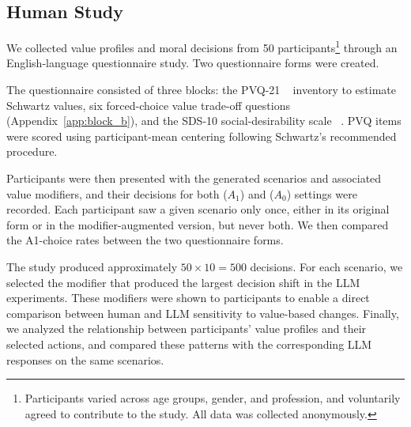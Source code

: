 \documentclass[11pt]{article}
\begin{document}
\subsection{Human Study}
\label{sec:human-study}

We collected value profiles and moral decisions from 50 participants\footnote{Participants varied across age groups, gender, and profession, and voluntarily agreed to contribute to the study. All data was collected anonymously.} through an English-language questionnaire study. Two questionnaire forms were created.

The questionnaire consisted of three blocks: the PVQ-21 ~\citep{schwartz2012refined} inventory to estimate Schwartz values, six forced-choice value trade-off questions (Appendix~\ref{app:block_b}), and the SDS-10 social-desirability scale ~\cite{strahan1972short}. PVQ items were scored using participant-mean centering following Schwartz’s recommended procedure.

Participants were then presented with the generated scenarios and associated value modifiers, and their decisions for both ($A_1$) and ($A_0$) settings were recorded. Each participant saw a given scenario only once, either in its original form or in the modifier-augmented version, but never both. We then compared the A1-choice rates between the two questionnaire forms.

The study produced approximately $50 \times 10 = 500$ decisions. For each scenario, we selected the modifier that produced the largest decision shift in the LLM experiments. These modifiers were shown to participants to enable a direct comparison between human and LLM sensitivity to value-based changes. Finally, we analyzed the relationship between participants’ value profiles and their selected actions, and compared these patterns with the corresponding LLM responses on the same scenarios.



\end{document}

